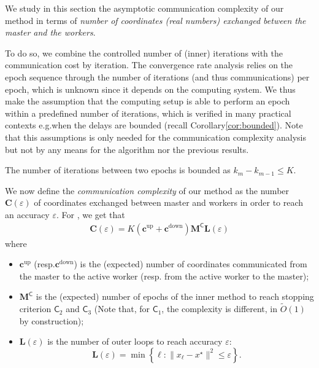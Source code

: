 We study in this section the asymptotic communication complexity of our method in terms of \emph{number of coordinates (\emph{real} numbers) exchanged between the master and the workers}. 

To do so, we combine the controlled number of (inner) iterations with the communication cost by iteration. The convergence rate analysis relies on the epoch sequence through the number of iterations (and thus communications) per epoch, which is unknown since it depends on the computing system. We thus make the assumption that the computing setup is able to perform an epoch within a predefined number of iterations, which is verified in many practical contexts e.g.\;when the delays are bounded (recall Corollary\;\ref{cor:bounded}). Note that this assumptions is only needed for the communication complexity analysis but not by any means for the algorithm nor the previous results.

\begin{assumption}
\label{hyp:delident2}
The number of iterations between two epochs is bounded as $k_{m} - k_{m-1} \leq K$.
\end{assumption}

We now define the \emph{communication complexity} of our method as the number $ \mathbf{C}(\varepsilon)$ of coordinates exchanged between master and workers in order to reach an accuracy $\varepsilon$. For \recoalgo, we get that 
\begin{align}\label{eq:commcomp}
    \mathbf{C}(\varepsilon) = K( \mathbf{c}^{\mathrm{up}} + \mathbf{c}^{\mathrm{down}} ) \mathbf{M}^{\mathsf{C}} \mathbf{L}(\varepsilon) 
\end{align}
where 
\begin{itemize}
    \item $\mathbf{c^{\mathrm{up}}}$ (resp.\;$\mathbf{c^{\mathrm{down}}}$) is the (expected) number of coordinates communicated from the master to the active worker (resp. from the active worker to the master);
    \item $\mathbf{M}^{\mathsf{C}}$ is the (expected) number of epochs of the inner method to reach stopping criterion $\mathsf{C}_2$ and $\mathsf{C}_3$
    (Note that, for $\mathsf{C}_1$, the complexity is different, in $\tilde{O}(1)$ by construction);
    \item $\mathbf{L}(\varepsilon)$ is the number of outer loops to reach accuracy $\varepsilon$:
    $$
    \mathbf{L}(\varepsilon) = \min \left\{ \ell : \|x_\ell - x^\star \|^2 \leq \varepsilon \right\}.
    $$
\end{itemize}

